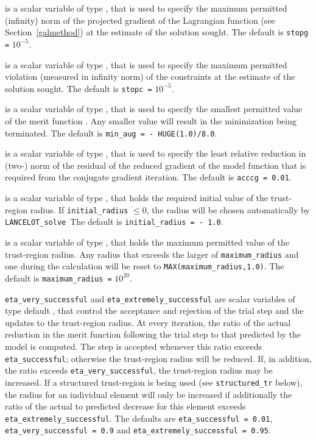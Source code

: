 \documentclass{galahad}
\newcommand{\fullpackagename}{LANC\-E\-LOT}
\newcommand{\solver}{{\tt \fullpackagename\_solve}}
\begin{document}
\begin{description}
 is a scalar variable of type \realdp,
that is used to specify the maximum permitted (infinity)
norm of the projected gradient of the Lagrangian function
(see Section~\ref{galmethod}) at the estimate of the solution sought.
The default is {\tt stopg =} $10^{-5}$.

 is a scalar variable of type \realdp, that is used to
specify the maximum permitted violation (measured in infinity
norm) of the constraints at the estimate of the solution sought.
The default is {\tt stopc =} $10^{-5}$.

 is a scalar variable of type \realdp, that is used
to specify the smallest permitted value of the merit function
. Any smaller value will result in the minimization
being terminated. The default is {\tt min\_aug = - HUGE(1.0)/8.0}.

 is a scalar variable of type \realdp, that is used to
specify the least relative reduction in (two-) norm of the residual
of the reduced gradient of the model function that is required
from the conjugate gradient iteration.
The default is {\tt acccg = 0.01}.

 is a scalar variable of type \realdp, that holds
the required initial value of the trust-region radius. If
{\tt initial\_radius} $\leq 0$, the radius will be chosen automatically
by \solver\
The default is {\tt initial\_radius = - 1.0}.

 is a scalar variable of type \realdp, that holds
the maximum permitted value of the trust-region radius. Any radius that
exceeds the larger of {\tt maximum\_radius} and one
during the calculation will be reset to
{\tt MAX(maximum\_radius,1.0)}.
The default is {\tt maximum\_radius =} $10^{20}$.

 {\tt eta\_very\_successful}
and {\tt eta\_extremely\_successful} are scalar variables of type default
\realdp, that control the acceptance and rejection of the trial step
and the updates to the trust-region radius.
At every iteration, the ratio of the actual reduction in the merit function
following the trial step to that predicted by the model is computed.
The step is accepted whenever this ratio exceeds {\tt eta\_successful};
otherwise the trust-region radius will be reduced.
If, in addition, the ratio exceeds {\tt eta\_very\_successful}, the trust-region
radius may be increased. If a structured trust-region is being used
(see {\tt structured\_tr} below), the radius for an individual element
will only be increased if additionally the ratio of the actual to
predicted decrease for this element exceeds {\tt eta\_extremely\_successful}.
The defaults are
{\tt eta\_successful = 0.01},
{\tt eta\_very\_successful = 0.9} and
{\tt eta\_extremely\_successful = 0.95}.


\end{description}
\end{document}
